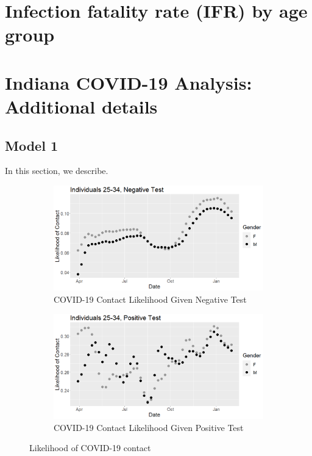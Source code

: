 \documentclass[11pt]{amsart}
\numberwithin{equation}{section}
\theoremstyle{plain}
\begin{document}
\section{Infection fatality rate (IFR) by age group}
\label{app:ifr}

\section{Indiana COVID-19 Analysis: Additional details}
\label{app:in_add_details}
\subsection{Model 1}

In this section, we describe.

\begin{figure}[!th]
\centering
\begin{subfigure}{.5\textwidth}
 \centering
 \includegraphics[width=.9\linewidth]{../figs/tvprop_contact_fig1.png}
 \caption{COVID-19 Contact Likelihood Given Negative Test}
 \label{fig:contactlik1}
\end{subfigure}%
\begin{subfigure}{.5\textwidth}
 \centering
\includegraphics[width=.9\linewidth]{../figs/tvprop_contact_fig2.png}
 \caption{COVID-19 Contact Likelihood Given Positive Test}
 \label{fig:contactlik2}
\end{subfigure}
\caption{Likelihood of COVID-19 contact}
\label{fig:contactlik}
\end{figure}
\end{document}
